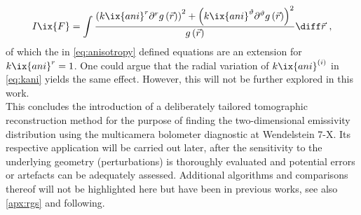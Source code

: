 %
            \begin{align}%
                I\ix{F}=\int\frac{%
                    \left(k\ix{ani}^{r}\partial^{r}g\left(\vec{r}\right)\right)^{2}+\left(k\ix{ani}^{\vartheta}\partial^{\vartheta}g\left(\vec{r}\right)\right)^{2}}{%
                    g\left(\vec{r}\right)}\diff\vec{r}\,\,,\nonumber%
            \end{align}%
%
            of which the in \cref{eq:anisotropy} defined equations are an extension for $k\ix{ani}^{r}=1$. One could argue that the radial variation of $k\ix{ani}^{\left(i\right)}$ in \cref{eq:kani} yields the same effect. However, this will not be further explored in this work.\\%
            This concludes the introduction of a deliberately tailored tomographic reconstruction method for the purpose of finding the two-dimensional emissivity distribution using the multicamera bolometer diagnostic at Wendelstein 7-X. Its respective application will be carried out later, after the sensitivity to the underlying geometry (perturbations) is thoroughly evaluated and potential errors or artefacts can be adequately assessed. Additional algorithms and comparisons thereof will not be highlighted here but have been in previous works\cite{Anton1996,Giannone1997,Li2021}, see also \cref{apx:rgs} and following.%
%
